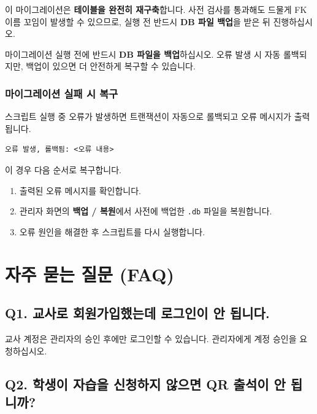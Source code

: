 \documentclass[a4paper,12pt]{article}
\newcommand{\menu}[1]{\textcolor{primary}{\textbf{#1}}}
\begin{document}
\begin{warnbox}
  이 마이그레이션은 \textbf{테이블을 완전히 재구축}합니다.
  사전 검사를 통과해도 드물게 FK 이름 꼬임이 발생할 수 있으므로,
  실행 전 반드시 \textbf{DB 파일 백업}을 받은 뒤 진행하십시오.
\end{warnbox}

\begin{warnbox}
  마이그레이션 실행 전에 반드시 \textbf{DB 파일을 백업}하십시오.
  오류 발생 시 자동 롤백되지만, 백업이 있으면 더 안전하게 복구할 수 있습니다.
\end{warnbox}

\subsubsection*{마이그레이션 실패 시 복구}

스크립트 실행 중 오류가 발생하면 트랜잭션이 자동으로 롤백되고 오류 메시지가 출력됩니다.

\begin{lstlisting}
오류 발생, 롤백됨: <오류 내용>
\end{lstlisting}

이 경우 다음 순서로 복구합니다.

\begin{enumerate}
  \item 출력된 오류 메시지를 확인합니다.
  \item 관리자 화면의 \menu{백업 / 복원}에서 사전에 백업한 \texttt{.db} 파일을 복원합니다.
  \item 오류 원인을 해결한 후 스크립트를 다시 실행합니다.
\end{enumerate}

\section{자주 묻는 질문 (FAQ)}

\subsection*{Q1. 교사로 회원가입했는데 로그인이 안 됩니다.}

교사 계정은 관리자의 승인 후에만 로그인할 수 있습니다.
관리자에게 계정 승인을 요청하십시오.

\subsection*{Q2. 학생이 자습을 신청하지 않으면 QR 출석이 안 됩니까?}
\end{document}
